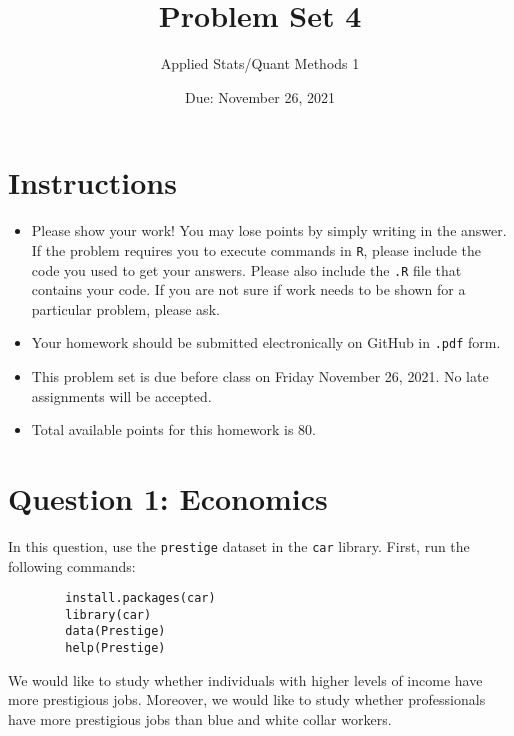 \documentclass[12pt,letterpaper]{article}
\title{Problem Set 4}
\date{Due: November 26, 2021}
\author{Applied Stats/Quant Methods 1}
\begin{document}
	\maketitle
	\section*{Instructions}
	\begin{itemize}
		\item Please show your work! You may lose points by simply writing in the answer. If the problem requires you to execute commands in \texttt{R}, please include the code you used to get your answers. Please also include the \texttt{.R} file that contains your code. If you are not sure if work needs to be shown for a particular problem, please ask.
		\item Your homework should be submitted electronically on GitHub in \texttt{.pdf} form.
		\item This problem set is due before class on Friday November 26, 2021. No late assignments will be accepted.
		\item Total available points for this homework is 80.
	\end{itemize}
		
	
	
	\vspace{.5cm}
	\section*{Question 1: Economics}
	\vspace{.25cm}
	\noindent 	
	In this question, use the \texttt{prestige} dataset in the \texttt{car} library. First, run the following commands:
	
	\begin{verbatim}
		install.packages(car)
		library(car)
		data(Prestige)
		help(Prestige)
	\end{verbatim} 
	
	
	\noindent We would like to study whether individuals with higher levels of income have more prestigious jobs. Moreover, we would like to study whether professionals have more prestigious jobs than blue and white collar workers.
	
\end{document}
